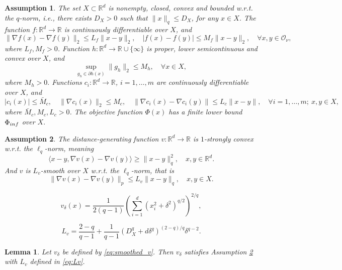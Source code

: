 \documentclass[10pt,a4paper]{amsart}
\newtheorem{assumption}{Assumption}
\newtheorem{lemma}{Lemma}
\newcommand{\R}{\mathbb{R}}
\newcommand{\be}{\begin{equation}}
\newcommand{\ee}{\end{equation}}
\begin{document}
\begin{assumption}\label{ass:lip}
    The set $X \subset \R^d$ is nonempty, closed, convex and bounded w.r.t. the $q$-norm, i.e., there exists  $D_X>0$ such that $\|x\|_q \le D_X$, for any $x\in X$. The function $f:\R^d \rightarrow \R$ is continuously differentiable over $X$, and  $$\|\nabla f(x)-\nabla f(y)\|_2\le L_f\|x-y\|_2,\quad | f(x) - f(y) | \leq M_f\| x - y\|_2, \quad \forall  x,y\in \mathcal O_\nu,$$
    where $L_f, M_f>0$. 
    Function {$h:\R^d \to \R\cup \{\infty\}$} is proper, lower semicontinuous and convex over $X$, and 
    \[\sup_{g_h \in \partial h(x)} \|g_h\|_2 \leq M_h, \quad  \forall x\in X,\]
    where $M_h>0.$ 
    Functions $c_i:\R^d \rightarrow \R$, $i=1,\ldots,m$ are continuously differentiable over $X$, and 
    $$ |c_i(x)|\le \bar M_c, \quad \|\nabla c_i(x)\|_2\le M_c, \quad \|\nabla c_i(x)-\nabla c_i(y)\|\le L_c\|x-y\|, \quad \forall i=1,\ldots,m;\ x,y\in X,$$
    where $\bar M_c, M_c, L_c>0$. The objective function $\Phi(x)$ has a finite lower bound $\Phi_{\rm inf}$ over $X.$
\end{assumption}

\begin{assumption}\label{ass:v}
    The distance-generating function $v: \mathbb{R}^d \to \mathbb{R}$ is $1$-strongly convex   w.r.t. the \(\ell_q\)-norm, meaning 
\be\label{v_str_cvx}
\langle x - y, \nabla v(x) - \nabla v(y) \rangle \geq \|x - y\|_q^2, \quad  x,y\in \mathbb R^d.
\ee
And $v$ is $L_v$-smooth over $X$ w.r.t. the $\ell_q$-norm, that is
\be\label{v_Lv_sm}
\|\nabla v(x)-\nabla v(y)\|_p
    \le L_v\|x-y\|_q,\quad  x,y \in X. 
\ee
\end{assumption}

\begin{equation}\label{eq:smoothed_v}
v_\delta(x) = \frac{1}{2(q-1)} ( \sum_{i=1}^d (x_i^2 + \delta^2)^{q/2} )^{2/q},
\end{equation}

\begin{equation}\label{eq:Lv}
    L_{v}= \frac{2-q}{q-1} +
    \frac{1}{q-1}
    (D_X^q+d\delta^q)^{(2-q)/q}\delta^{q-2}.
\end{equation}

\begin{lemma}\label{lem:smooth-mirror-map}
Let $v_\delta$ be defined by \eqref{eq:smoothed_v}. %
Then $v_\delta$ satisfies Assumption \ref{ass:v}
with $L_v$ defined in \eqref{eq:Lv}.
\end{lemma}
\end{document}

